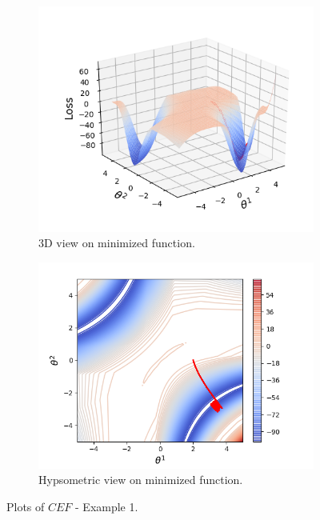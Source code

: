 \documentclass[11pt,a4paper]{IEEEtran}
\begin{document}
\begin{figure}[!hbt]
\centering
	\begin{subfigure}[b]{0.47\textwidth}
		\includegraphics[width=\textwidth]{examples/3/3d.png}
		\caption{3D view on minimized function.}
		\label{fig:ex3:3d-view}
	\end{subfigure}
	\begin{subfigure}[b]{0.47\textwidth}
		\includegraphics[width=\textwidth]{examples/3/2d.png}
		\caption{Hypsometric view on minimized function.}
		\label{fig:ex3:hypsometric}
	\end{subfigure}
	\caption{Plots of $CEF$ - Example 1.}
	\label{fig:ex3}
\end{figure}
	
\end{document}
